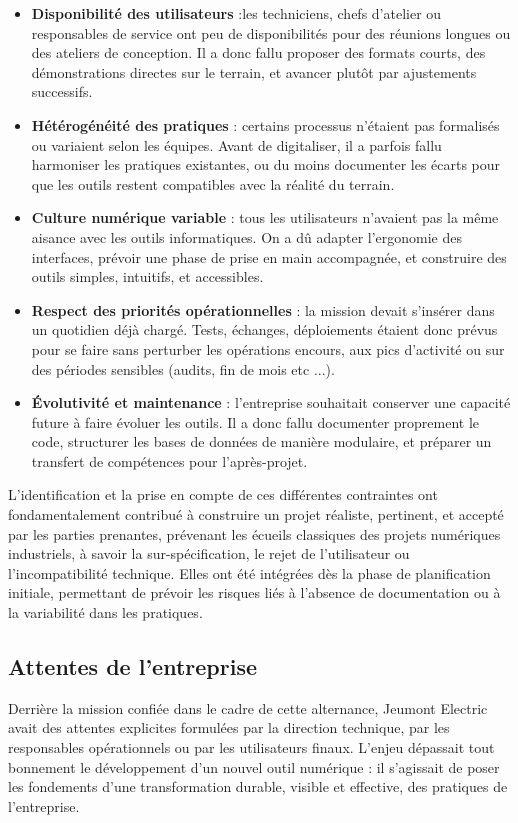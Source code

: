 \documentclass[11pt,a4paper]{article}
\begin{document}
\begin{itemize}
    \item \textbf{Disponibilité des utilisateurs} :les techniciens, chefs d’atelier ou responsables de service ont peu de disponibilités pour des réunions longues ou des ateliers de conception. Il a donc fallu proposer des formats courts, des démonstrations directes sur le terrain, et avancer plutôt par ajustements successifs.
    
    
    \item \textbf{Hétérogénéité des pratiques} : certains processus n’étaient pas formalisés ou variaient selon les équipes. Avant de digitaliser, il a parfois fallu harmoniser les pratiques existantes, ou du moins documenter les écarts pour que les outils restent compatibles avec la réalité du terrain.

    \item \textbf{Culture numérique variable} :  tous les utilisateurs n’avaient pas la même aisance avec les outils informatiques. On a dû adapter l’ergonomie des interfaces, prévoir une phase de prise en main accompagnée, et construire des outils simples, intuitifs, et accessibles.

    \item \textbf{Respect des priorités opérationnelles} : la mission devait s’insérer dans un quotidien déjà chargé. Tests, échanges, déploiements étaient donc prévus pour se faire sans perturber les opérations encours, aux pics d’activité ou sur des périodes sensibles (audits, fin de mois etc ...).
    
    \item \textbf{Évolutivité et maintenance} : l’entreprise souhaitait conserver une capacité future à faire évoluer les outils. Il a donc fallu documenter proprement le code, structurer les bases de données de manière modulaire, et préparer un transfert de compétences pour l’après-projet.
\end{itemize}

L’identification et la prise en compte de ces différentes contraintes ont fondamentalement contribué à construire un projet réaliste, pertinent, et accepté par les parties prenantes, prévenant les écueils classiques des projets numériques industriels, à savoir la sur-spécification, le rejet de l’utilisateur ou l’incompatibilité technique. Elles ont été intégrées dès la phase de planification initiale, permettant de prévoir les risques liés à l’absence de documentation ou à la variabilité dans les pratiques.


\subsection{Attentes de l’entreprise}
Derrière la mission confiée dans le cadre de cette alternance, Jeumont Electric avait des attentes explicites formulées par la direction technique, par les responsables opérationnels ou par les utilisateurs finaux. L’enjeu dépassait tout bonnement le développement d’un nouvel outil numérique : il s’agissait de poser les fondements d’une transformation durable, visible et effective, des pratiques de l’entreprise.
\end{document}
